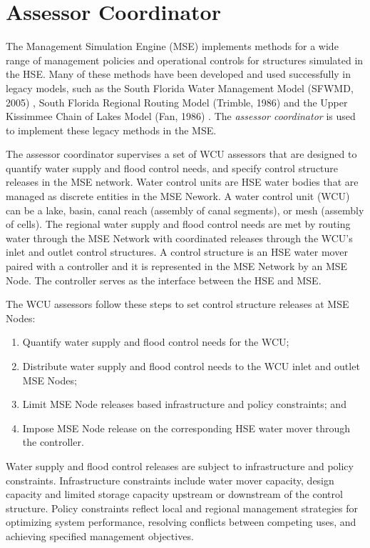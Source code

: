 \chapter{Assessor Coordinator}

The Management Simulation Engine (MSE) implements methods for a wide
range of management policies and operational controls for structures
simulated in the HSE.  Many of these methods have been developed and
used successfully in legacy models, such as the South Florida Water
Management Model (SFWMD, 2005) \nocite{sfwmm:2005}, South Florida
Regional Routing Model (Trimble, 1986) \nocite{trimble:86} and the
Upper Kissimmee Chain of Lakes Model (Fan, 1986) \nocite{fan:86}.  The
\emph{assessor coordinator} is used to implement these legacy methods
in the MSE.

The assessor coordinator supervises a set of WCU assessors that are
designed to quantify water supply and flood control needs, and specify
control structure releases in the MSE network. Water control units are
HSE water bodies that are managed as discrete entities in the MSE
Nework. A water control unit (WCU) can be a lake, basin, canal reach
(assembly of canal segments), or mesh (assembly of cells). The
regional water supply and flood control needs are met by routing water
through the MSE Network with coordinated releases through the WCU's
inlet and outlet control structures. A control structure is an HSE
water mover paired with a controller and it is represented in the MSE
Network by an MSE Node. The controller serves as the interface between
the HSE and MSE.

The WCU assessors follow these steps to set control structure releases
at MSE Nodes:

\begin{enumerate}
 \item Quantify water supply and flood control needs for the WCU;
 \item Distribute water supply and flood control needs to the WCU
   inlet and outlet MSE Nodes;
 \item Limit MSE Node releases based infrastructure and policy
   constraints; and
 \item Impose MSE Node release on the corresponding HSE water mover
   through the controller.
 \end{enumerate}

Water supply and flood control releases are subject to infrastructure
and policy constraints. Infrastructure constraints include water
mover capacity, design capacity and limited storage capacity upstream
or downstream of the control structure.  Policy constraints reflect
local and regional management strategies for optimizing system
performance, resolving conflicts between competing uses, and achieving
specified management objectives.

